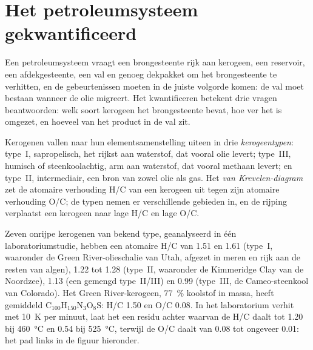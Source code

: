 \section{Het petroleumsysteem gekwantificeerd}\label{sec:b2:energy-geology:petroleum}

Een petroleumsysteem vraagt een brongesteente rijk aan kerogeen, een reservoir, een afdekgesteente, een val en genoeg
dekpakket om het brongesteente te verhitten, en de gebeurtenissen moeten in de juiste volgorde komen: de val moet
bestaan wanneer de olie migreert. Het kwantificeren betekent drie vragen beantwoorden: welk soort kerogeen
het brongesteente bevat, hoe ver het is omgezet, en hoeveel van het product in de
val zit.

\begin{definition}\label{def:b2:energy-geology:kerogen}
Kerogenen vallen naar hun elementsamenstelling uiteen in drie \emph{kerogeentypen}:
type~I, sapropelisch, het rijkst aan waterstof, dat vooral olie levert; type~III, humisch of steenkoolachtig,
arm aan waterstof, dat vooral methaan levert; en type~II, intermediair, een bron van zowel olie
als gas. Het \emph{van Krevelen-diagram} zet de atomaire verhouding H/C van
een kerogeen uit tegen zijn atomaire verhouding O/C; de typen nemen er verschillende gebieden in, en de rijping
verplaatst een kerogeen naar lage H/C en lage O/C.
\end{definition}

Zeven onrijpe kerogenen van bekend type, geanalyseerd in één laboratoriumstudie, hebben een atomaire H/C van
1.51 en 1.61 (type~I, waaronder de Green River-olieschalie van Utah, afgezet in meren en rijk aan
de resten van algen), 1.22 tot 1.28 (type~II, waaronder de Kimmeridge Clay van de Noordzee),
1.13 (een gemengd type~II/III) en 0.99 (type~III, de Cameo-steenkool van Colorado). Het Green
River-kerogeen, \qty{77}{\percent} koolstof in massa, heeft gemiddeld C$_{100}$H$_{150}$N$_3$O$_8$S: H/C 1.50 en
O/C 0.08. In het laboratorium verhit met \qty{10}{K} per minuut, laat het een residu achter waarvan de H/C daalt tot
1.20 bij \qty{460}{\celsius} en 0.54 bij \qty{525}{\celsius}, terwijl de O/C daalt van 0.08 tot ongeveer
0.01: het pad links in de figuur hieronder.

